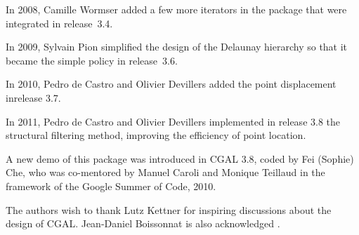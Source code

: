 In 2008, Camille Wormser added a few more iterators in
the package that were integrated in release~3.4.

In 2009, Sylvain Pion simplified the design of the Delaunay hierarchy
so that it became the simple  policy in release~3.6.

In 2010, Pedro de Castro and Olivier Devillers added the point
displacement inrelease 3.7.

In 2011,  Pedro de Castro and Olivier Devillers implemented in release
3.8 the
structural filtering method, improving the efficiency of point location.

A new demo of this package was introduced in CGAL 3.8, coded by Fei
(Sophie) Che, who was co-mentored by Manuel Caroli and Monique
Teillaud in the framework of the Google Summer of Code, 2010.

The authors wish to thank Lutz Kettner for inspiring discussions about
the design of CGAL. Jean-Daniel Boissonnat is also acknowledged
\cite{bdty-tcgal-00}.
